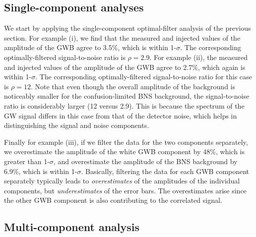 \subsection{Single-component analyses}

We start by applying the single-component optimal-filter
analysis of the previous section.
For example (i), we find that the measured and injected
values of the amplitude of the GWB agree to 3.5\%, 
which is within 1-$\sigma$.
The corresponding optimally-filtered signal-to-noise
ratio is $\rho=2.9$.
For example (ii), the measured and injected values of
the amplitude of the GWB agree to 2.7\%, which again 
is within 1-$\sigma$.
The corresponding optimally-filtered signal-to-noise
ratio for this case is $\rho=12$.
Note that even though the overall amplitude of the
background is noticeably smaller for the confusion-limited
BNS background, the signal-to-noise ratio is considerably
larger (12 versus 2.9).
This is because the spectrum of the GW signal differs 
in this case from that of the detector noise,
which helps in distinguishing the signal and noise components.

Finally for example (iii), if we filter the data for 
the two components separately, 
we overestimate the amplitude of the white GWB component 
by 48\%, which is greater than 1-$\sigma$, and overestimate
the amplitude of the BNS background by 6.9\%, which is within 1-$\sigma$.
Basically, filtering the data for each GWB component 
separately typically leads to {\em overestimates}
of the amplitudes of the individual components, 
but {\em underestimates} of the error bars.
The overestimates arise since the other GWB component is
also contributing to the correlated signal.

\subsection{Multi-component analysis}

